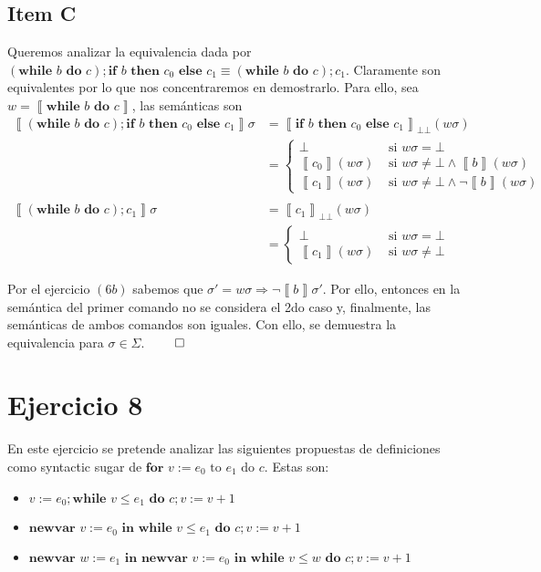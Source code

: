 \documentclass{article}
\newcommand{\sem}[1]{\left\llbracket #1\right\rrbracket}
\newcommand{\bbot}{\bot\!\!\!\bot}
\newcommand{\cif}[3]{\textbf{if }#1\textbf{ then }#2\textbf{ else }#3}
\newcommand{\cnewvar}[3]{\textbf{newvar }#1 := #2\textbf{ in }#3}
\newcommand{\cwhile}[2]{\textbf{while }#1\textbf{ do }#2}
\newcommand{\cfor}[4]{\textbf{for }#1 := #2\text{ to }#3\text{ do }#4}
\begin{document}
\subsection*{Item C}
Queremos analizar la equivalencia dada por $(\cwhile{b}{c}); \cif{b}{c_0}{c_1} \equiv (\cwhile{b}{c}); c_1$.
Claramente son equivalentes por lo que nos concentraremos en demostrarlo.
Para ello, sea $w = \sem{\cwhile{b}{c}}$, las semánticas son
\begin{equation*}
  \begin{aligned}
    \sem{(\cwhile{b}{c});\cif{b}{c_0}{c_1}} \sigma &= \sem{\cif{b}{c_0}{c_1}}_{\bbot} (w \sigma) \\ 
                                                   &= \begin{cases}
                                                     \bot &\text{ si } w\sigma = \bot \\ 
                                                     \sem{c_0} (w \sigma) &\text{ si } w\sigma \neq \bot \land \sem{b}(w\sigma) \\ 
                                                     \sem{c_1} (w \sigma) &\text{ si }w\sigma \neq \bot \land \neg\sem{b}(w\sigma)
                                                   \end{cases} \\ 
                                                   \\ 
    \sem{(\cwhile{b}{c});c_1} \sigma &= \sem{c_1}_{\bbot} (w\sigma) \\ 
                                     &= \begin{cases}
                                       \bot &\text{ si }w\sigma = \bot \\ 
                                       \sem{c_1}(w\sigma) &\text{ si }w\sigma \neq \bot
                                     \end{cases}
  \end{aligned}
\end{equation*}

Por el ejercicio $(6b)$ sabemos que $\sigma' = w\sigma \Rightarrow \neg\sem{b}\sigma'$.
Por ello, entonces en la semántica del primer comando no se considera el 2do caso y, finalmente, las semánticas de ambos comandos son iguales.
Con ello, se demuestra la equivalencia para $\sigma \in \Sigma$. $\qed$

\section*{Ejercicio 8}
En este ejercicio se pretende analizar las siguientes propuestas de definiciones como syntactic sugar de $\cfor{v}{e_0}{e_1}{c}$.
Estas son:
\begin{itemize}
  \item $v := e_0; \cwhile{v \leq e_1}{c}; v := v + 1$
  \item $\cnewvar{v}{e_0}{\cwhile{v \leq e_1}{c}; v := v + 1}$
  \item $\cnewvar{w}{e_1}{\cnewvar{v}{e_0}{\cwhile{v \leq w}{c; v := v + 1}}}$
\end{itemize}
\end{document}
